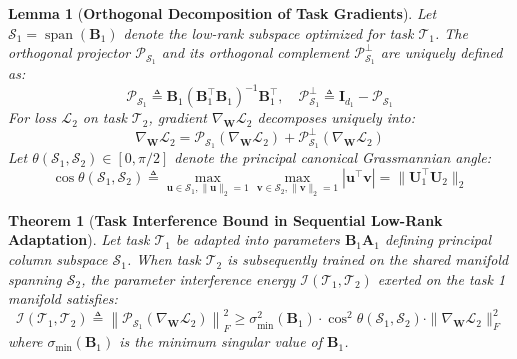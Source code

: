 \documentclass{article}
\newtheorem{theorem}{Theorem}
\newtheorem{lemma}{Lemma}
\begin{document}
\begin{lemma}[\textbf{Orthogonal Decomposition of Task Gradients}]
Let $\mathcal{S}_1 = \operatorname{span}(\mathbf{B}_1)$ denote the low-rank subspace optimized for task $\mathcal{T}_1$. The orthogonal projector $\mathcal{P}_{\mathcal{S}_1}$ and its orthogonal complement $\mathcal{P}_{\mathcal{S}_1}^\perp$ are uniquely defined as:
\begin{equation}
\label{eq:projector_def}
\mathcal{P}_{\mathcal{S}_1} \triangleq \mathbf{B}_1 (\mathbf{B}_1^\top \mathbf{B}_1)^{-1} \mathbf{B}_1^\top, \quad \mathcal{P}_{\mathcal{S}_1}^\perp \triangleq \mathbf{I}_{d_1} - \mathcal{P}_{\mathcal{S}_1}
\end{equation}
For loss $\mathcal{L}_2$ on task $\mathcal{T}_2$, gradient $\nabla_{\mathbf{W}} \mathcal{L}_2$ decomposes uniquely into:
\begin{equation}
\label{eq:gradient_decomp}
\nabla_{\mathbf{W}} \mathcal{L}_2 = \mathcal{P}_{\mathcal{S}_1}(\nabla_{\mathbf{W}} \mathcal{L}_2) + \mathcal{P}_{\mathcal{S}_1}^\perp(\nabla_{\mathbf{W}} \mathcal{L}_2)
\end{equation}
Let $\theta(\mathcal{S}_1, \mathcal{S}_2) \in [0, \pi/2]$ denote the principal canonical Grassmannian angle:
\begin{equation}
\label{eq:canonical_angle}
\cos \theta(\mathcal{S}_1, \mathcal{S}_2) \triangleq \max_{\mathbf{u} \in \mathcal{S}_1, \|\mathbf{u}\|_2=1} \max_{\mathbf{v} \in \mathcal{S}_2, \|\mathbf{v}\|_2=1} |\mathbf{u}^\top \mathbf{v}| = \|\mathbf{U}_1^\top \mathbf{U}_2\|_2
\end{equation}
\end{lemma}

\begin{theorem}[\textbf{Task Interference Bound in Sequential Low-Rank Adaptation}]
Let task $\mathcal{T}_1$ be adapted into parameters $\mathbf{B}_1 \mathbf{A}_1$ defining principal column subspace $\mathcal{S}_1$. When task $\mathcal{T}_2$ is subsequently trained on the shared manifold spanning $\mathcal{S}_2$, the parameter interference energy $\mathcal{I}(\mathcal{T}_1, \mathcal{T}_2)$ exerted on the task 1 manifold satisfies:
\begin{equation}
\label{eq:interference_bound}
\mathcal{I}(\mathcal{T}_1, \mathcal{T}_2) \triangleq \left\| \mathcal{P}_{\mathcal{S}_1} \left( \nabla_{\mathbf{W}} \mathcal{L}_2 \right) \right\|_F^2 \ge \sigma_{\min}^2(\mathbf{B}_1) \cdot \cos^2 \theta(\mathcal{S}_1, \mathcal{S}_2) \cdot \|\nabla_{\mathbf{W}} \mathcal{L}_2\|_F^2
\end{equation}
where $\sigma_{\min}(\mathbf{B}_1)$ is the minimum singular value of $\mathbf{B}_1$.
\end{theorem}
\end{document}
